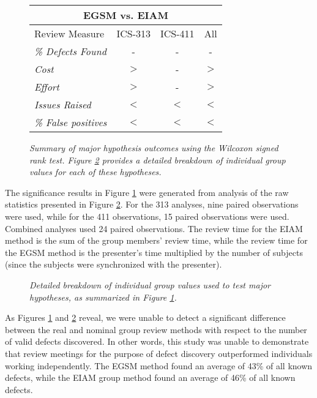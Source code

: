 \begin{figure}[ht]
  \small
  \begin{center}
  \begin{tabular}{|l|c|c|c|}
    \hline
  \multicolumn{4}{|c|}{EGSM vs. EIAM}\\
   \hline
Review Measure    & ICS-313 & ICS-411 & All \\
   \hline
{\em \% Defects Found}         & -       & -       & - \\
{\em Cost}     & $>$     & -       & $>$ \\  
{\em Effort}          & $>$     & -       & $>$ \\
{\em Issues Raised}          & $<$     & $<$     & $<$ \\
{\em \% False positives} & $<$     & $<$     & $<$ \\
  \hline
   \end{tabular}
  \end{center}
 \caption{{\em Summary of major hypothesis outcomes using the
Wilcoxon signed rank test. Figure \ref{fig:main-hypothesis} provides
a detailed breakdown of individual group values for each of these hypotheses.}}
 \label{fig:wilcoxon-results}
\normalsize
\end{figure}

The significance results in Figure \ref{fig:wilcoxon-results} were
generated from analysis of the raw statistics presented in Figure
\ref{fig:main-hypothesis}. For the 313 analyses, nine paired observations
were used, while for the 411 observations, 15 paired observations were
used.  Combined analyses used 24 paired observations.  The review time for
the EIAM method is the sum of the group members' review time, while the
review time for the EGSM method is the presenter's time multiplied by the
number of subjects (since the subjects were synchronized with the
presenter).

\begin{figure}[htpb]
 {\centerline{}}
 \caption{{\em Detailed breakdown of individual group values used to test
major hypotheses, as summarized in Figure \ref{fig:wilcoxon-results}.}}
 \label{fig:main-hypothesis}
\end{figure}


As Figures \ref{fig:wilcoxon-results} and \ref{fig:main-hypothesis} reveal,
we were unable to detect a significant difference between the real and
nominal group review methods with respect to the number of valid defects
discovered. In other words, this study was unable to demonstrate that
review meetings for the purpose of defect discovery outperformed
individuals working independently.  The EGSM method found an average
of 43\% of all known defects, while the EIAM group method found an
average of 46\% of all known defects.

